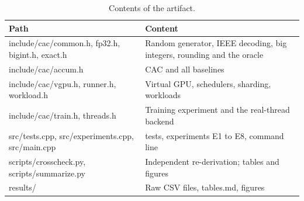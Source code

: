 \documentclass[journal]{IEEEtran}
\begin{document}
\begin{table}[!htbp]\centering\small\setlength{\tabcolsep}{4pt}
\caption{Contents of the artifact.}\label{tab:24}
\begin{tabularx}{\linewidth}{>{\raggedright\arraybackslash\hsize=1.000\hsize}X>{\raggedright\arraybackslash\hsize=1.000\hsize}X}
\toprule
Path & Content \\
\midrule
include/cac/common.h, fp32.h, bigint.h, exact.h & Random generator, IEEE decoding, big integers, rounding and the oracle \\
include/cac/accum.h & CAC and all baselines \\
include/cac/vgpu.h, runner.h, workload.h & Virtual GPU, schedulers, sharding, workloads \\
include/cac/train.h, threads.h & Training experiment and the real-thread backend \\
src/tests.cpp, src/experiments.cpp, src/main.cpp & 55 tests, experiments E1 to E8, command line \\
scripts/crosscheck.py, scripts/summarize.py & Independent re-derivation; tables and figures \\
results/ & Raw CSV files, tables.md, figures \\
\bottomrule
\end{tabularx}
\end{table}
\end{document}

